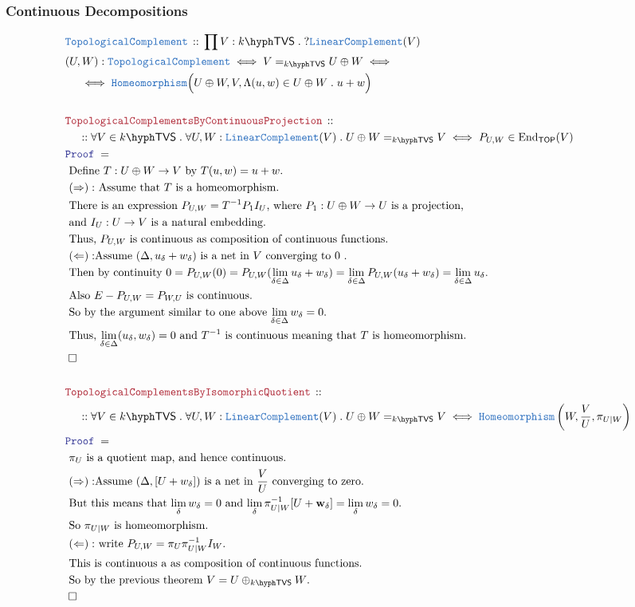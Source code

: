 \documentclass[12pt]{scrartcl}
\newcommand{\TYPE}[1]{\textcolor{NavyBlue}{\mathtt{#1}}}
\newcommand{\LOGIC}[1]{\textcolor{Blue}{\mathtt{#1}}}
\newcommand{\THM}[1]{\textcolor{Maroon}{\mathtt{#1}}}
\renewcommand{\.}{\; . \;}
\newcommand{\Theorem}[2]{& \THM{#1} \, :: \, #2 \\ & \Proof = \\ }
\newcommand{\DeclareType}[2]{& \TYPE{#1} \, :: \, #2 \\}
\newcommand{\DefineNamedType}[4]{& #1 : \TYPE{#2} \iff #3 \iff #4 \\}
\newcommand{\NewLine}{\\ & \kern 1pc}
\newcommand{\Page}[1]{ \begin{align*} #1 \end{align*}   }
\newcommand{\Explain}[1]{& \text{#1.} \\}
\newcommand{\ExplainFurther}[1]{& \text{#1} \\}
\newcommand{\End}{\mathrm{End}}
\newcommand{\QED}{\; \square}
\newcommand{\EndProof}{& \QED \\}
\newcommand{\Proof}{\LOGIC{Proof} \; }
\newcommand{\Homeo}{\TYPE{Homeomorphism}}
\newcommand{\TOP}{\mathsf{TOP}}
\newcommand{\LC}{\TYPE{LinearComplement}}
\newcommand{\w}{\mathbf{w}}
\newcommand{\TVS}[1]{{#1}\hyph\mathsf{TVS}}
\begin{document}
\subsubsection{Continuous Decompositions}
\Page{
	\DeclareType{TopologicalComplement}
	{
		\prod V : \TVS{k} \. ?\LC(V)
	}
	\DefineNamedType{(U,W)}{TopologicalComplement}{V =_{\TVS{k}} U \oplus W}
	{
		\NewLine \iff		
		\Homeo\Big(U\oplus W, V, \Lambda(u,w) \in U \oplus W \. u  + w  \Big)  
	}
	\\
	\Theorem{TopologicalComplementsByContinuousProjection}
	{
		\NewLine ::		
		\forall V  \in \TVS{k} \.
		\forall U,W : \LC(V) \. 
		U \oplus W =_{\TVS{k}} V
		\iff
		P_{U,W} \in \End_{\TOP}(V) 		
	}
	\Explain{
		Define $T : U \oplus W \to V$ by $T(u,w) = u + w$}
	\Explain{ 
		$(\Rightarrow):$ Assume that $T$ is a homeomorphism}
	\ExplainFurther{ 
		There is an expression $P_{U,W} = T^{-1} P_1 I_U$,
		where $P_1 : U \oplus W \to U$ is a projection,}
	\Explain{ 
		and $I_U : U \to V$ is a natural embedding}
	\Explain{
		Thus, $P_{U,W}$ is continuous as composition 
		of continuous functions}
	\Explain{
		$(\Leftarrow):$Assume $(\Delta, u_\delta + w_\delta)$ is a net in $V$ 
		converging to $0$
	}
	\Explain{
		Then by continuity 
		$
			0 = P_{U,W}(0) = 
			P_{U,W}(\lim_{\delta \in \Delta} u_\delta + w_\delta)  =
			\lim_{\delta \in \Delta} P_{U,W} (u_\delta + w_\delta) = 
			\lim_{\delta \in \Delta} u_\delta
		$}
	\Explain{
		Also $E - P_{U,W} = P_{W,U}$ is continuous}
	\Explain{
		So by the argument similar to one above $\lim_{\delta \in \Delta} w_\delta = 0$}
	\Explain{
		Thus, $\lim_{\delta \in \Delta} (u_\delta,w_\delta) = 0$ and $T^{-1}$ is  
		continuous meaning that $T$ is homeomorphism}
		\EndProof
	\\
	\Theorem{TopologicalComplementsByIsomorphicQuotient}
	{
		\NewLine ::		
		\forall V  \in \TVS{k} \.
		\forall U,W : \LC(V) \. 
		U \oplus W =_{\TVS{k}} V
		\iff
		\Homeo\left(W,\frac{V}{U}, \pi_{U|W} \right)
	}
	\Explain{ 
		$\pi_U$ is a quotient map, and hence continuous}
	\Explain{
		$(\Rightarrow):$Assume $(\Delta,[U + w_\delta])$ is a net in $\frac{V}{U}$ converging to zero}
	\Explain{
			But this means that $\lim_\delta w_\delta = 0$ 
			and $\lim_\delta \pi_{U|W}^{-1}[U + \w_\delta] = \lim_\delta w_\delta= 0$}
	\Explain{
		So $\pi_{U|W}$ is homeomorphism}
	\Explain{
		$(\Leftarrow):$ write $P_{U,W} = \pi_{U} \pi_{U|W}^{-1} I_W$}
	\Explain{
		This is continuous a as composition of continuous functions}
	\Explain{
		So by the previous theorem $V = U \oplus_{\TVS{k}} W$}
	\EndProof
	\\
}
\end{document}
